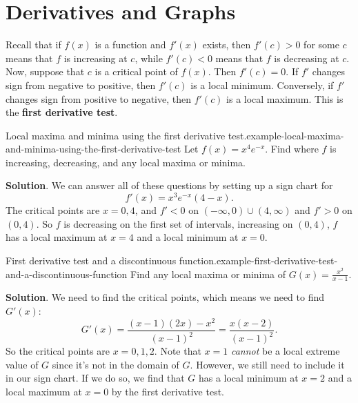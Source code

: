 \documentclass[10pt,]{book}
\newcommand{\terminology}[1]{\textbf{#1}}
\numberwithin{equation}{section}
\begin{document}
\section[{Derivatives and Graphs}]{Derivatives and Graphs}\label{section-derivatives-and-graphs}
\hypertarget{p-346}{}%
Recall that if \(f(x)\) is a function and \(f'(x)\) exists, then \(f'(c) > 0\) for some \(c\) means that \(f\) is increasing at \(c\), while \(f'(c) < 0\) means that \(f\) is decreasing at \(c\). Now, suppose that \(c\) is a critical point of \(f(x)\). Then \(f'(c) = 0\). If \(f'\) changes sign from negative to positive, then \(f'(c)\) is a local minimum. Conversely, if \(f'\) changes sign from positive to negative, then \(f'(c)\) is a local maximum. This is the \terminology{first derivative test}.%
\begin{example}{Local maxima and minima using the first derivative test.}{example-local-maxima-and-minima-using-the-first-derivative-test}%
\hypertarget{p-347}{}%
Let \(f(x) = x^{4}e^{-x}\). Find where \(f\) is increasing, decreasing, and any local maxima or minima.%
\par\smallskip%
\noindent\textbf{Solution}.\hypertarget{solution-75}{}\quad%
\hypertarget{p-348}{}%
We can answer all of these questions by setting up a sign chart for%
\begin{equation*}
f'(x) = x^{3}e^{-x}(4-x)\text{.}
\end{equation*}
The critical points are \(x=0,4\), and \(f' < 0\) on \((-\infty,0)\cup(4,\infty)\) and \(f' > 0\) on \((0,4)\). So \(f\) is decreasing on the first set of intervals, increasing on \((0,4)\), \(f\) has a local maximum at \(x=4\) and a local minimum at \(x=0\).%
\end{example}
\begin{example}{First derivative test and a discontinuous function.}{example-first-derivative-test-and-a-discontinuous-function}%
\hypertarget{p-349}{}%
Find any local maxima or minima of \(G(x) = \frac{x^{2}}{x-1}\).%
\par\smallskip%
\noindent\textbf{Solution}.\hypertarget{solution-76}{}\quad%
\hypertarget{p-350}{}%
We need to find the critical points, which means we need to find \(G'(x)\):%
\begin{equation*}
G'(x) = \frac{(x-1)(2x) - x^{2}}{(x-1)^{2}} = \frac{x(x-2)}{(x-1)^{2}}.
\end{equation*}
So the critical points are \(x=0,1,2\). Note that \(x=1\) \emph{cannot} be a local extreme value of \(G\) since it's not in the domain of \(G\). However, we still need to include it in our sign chart. If we do so, we find that \(G\) has a local minimum at \(x=2\) and a local maximum at \(x=0\) by the first derivative test.%
\end{example}
\end{document}

